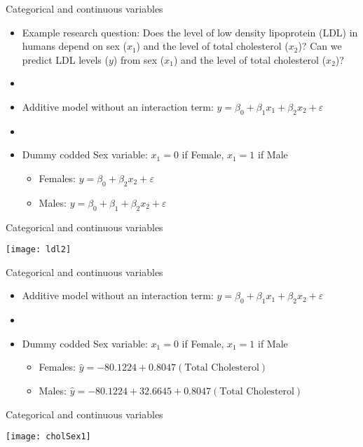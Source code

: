 \documentclass[xcolor=dvipsnames]{beamer}
\begin{document}
\begin{frame}{Categorical and continuous variables}
	\begin{itemize}
		\item Example research question: Does the level of low density lipoprotein (LDL) in humans depend on sex ($x_1$) and the level of total cholesterol ($x_2$)? Can we predict LDL levels ($y$) from sex ($x_1$) and the level of total cholesterol ($x_2$)?
		\item[]
		\item Additive model without an interaction term: $y = \beta_0 + \beta_1 x_1 + \beta_2 x_2 + \varepsilon $
		\item[]
		\item Dummy codded Sex variable: $x_1 = 0$ if Female, $x_1 = 1$ if Male
		\begin{itemize}
			\item Females: $y = \beta_0 + \beta_2 x_2 + \varepsilon $
			\item Males: $y = \beta_0 + \beta_1 + \beta_2 x_2 + \varepsilon $
		\end{itemize}
	\end{itemize}
\end{frame}

\begin{frame}{Categorical and continuous variables}
	\begin{center}
		\texttt{[image: ldl2]}
	\end{center}
\end{frame}

\begin{frame}{Categorical and continuous variables}
	\begin{itemize}
		\item Additive model without an interaction term: $y = \beta_0 + \beta_1 x_1 + \beta_2 x_2 + \varepsilon $
		\item[]
		\item Dummy codded Sex variable: $x_1 = 0$ if Female, $x_1 = 1$ if Male
		\begin{itemize}
			\item Females: $\hat{y} = -80.1224 + 0.8047 (\text{Total Cholesterol})  $
			\item Males: $\hat{y} = -80.1224 + 32.6645 + 0.8047(\text{Total Cholesterol}) $
		\end{itemize}
	\end{itemize}
\end{frame}

\begin{frame}{Categorical and continuous variables}
	\begin{center}
		\texttt{[image: cholSex1]}
	\end{center}
\end{frame}
\end{document}
